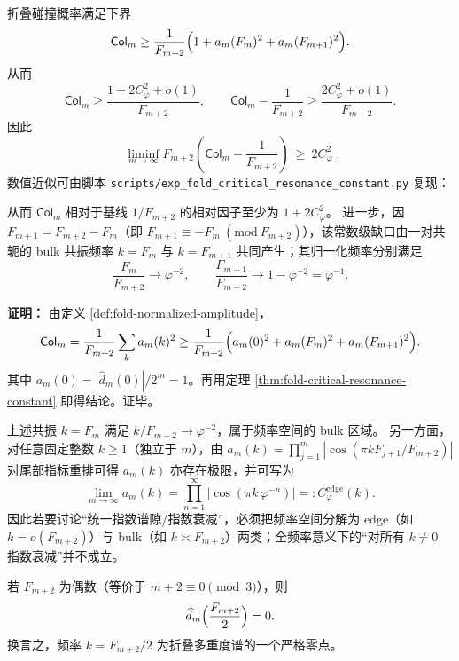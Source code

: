 \begin{corollary}[不可消除的常数级均匀性缺口]\label{cor:fold-critical-resonance-gap}
折叠碰撞概率满足下界
\[
\mathsf{Col}_m
\ge
\frac{1}{F_{m+2}}\Bigl(1+a_m(F_m)^2+a_m(F_{m+1})^2\Bigr).
\]
从而
\[
\mathsf{Col}_m
\ge \frac{1+2C_\varphi^2+o(1)}{F_{m+2}},
\qquad
\mathsf{Col}_m-\frac{1}{F_{m+2}}
\ge \frac{2C_\varphi^2+o(1)}{F_{m+2}}.
\]
因此
\[
\boxed{\;
\liminf_{m\to\infty}F_{m+2}\!\left(\mathsf{Col}_m-\frac{1}{F_{m+2}}\right)\ \ge\ 2C_\varphi^2\; }.
\]
数值近似可由脚本 \texttt{scripts/exp\_fold\_critical\_resonance\_constant.py} 复现：

从而 \(\mathsf{Col}_m\) 相对于基线 \(1/F_{m+2}\) 的相对因子至少为 \(1+2C_\varphi^2\)。
进一步，因 \(F_{m+1}=F_{m+2}-F_m\)（即 \(F_{m+1}\equiv -F_m\ (\mathrm{mod}\ F_{m+2})\)），该常数级缺口由一对共轭的 bulk 共振频率 \(k=F_m\) 与 \(k=F_{m+1}\) 共同产生；其归一化频率分别满足
\[
\frac{F_m}{F_{m+2}}\to \varphi^{-2},\qquad
\frac{F_{m+1}}{F_{m+2}}\to 1-\varphi^{-2}=\varphi^{-1}.
\]
\end{corollary}

\textbf{证明：}
由定义 \ref{def:fold-normalized-amplitude}，
\[
\mathsf{Col}_m=\frac{1}{F_{m+2}}\sum_{k}a_m(k)^2
\ge \frac{1}{F_{m+2}}\Bigl(a_m(0)^2+a_m(F_m)^2+a_m(F_{m+1})^2\Bigr).
\]
其中 \(a_m(0)=|\widehat d_m(0)|/2^m=1\)。再用定理 \ref{thm:fold-critical-resonance-constant} 即得结论。证毕。

\begin{remark}\label{rem:fold-edge-nondecay}
上述共振 \(k=F_m\) 满足 \(k/F_{m+2}\to \varphi^{-2}\)，属于频率空间的 bulk 区域。
另一方面，对任意固定整数 \(k\ge 1\)（独立于 \(m\)），由
\(
a_m(k)=\prod_{j=1}^m|\cos(\pi kF_{j+1}/F_{m+2})|
\)
对尾部指标重排可得 \(a_m(k)\) 亦存在极限，并可写为
\[
\lim_{m\to\infty}a_m(k)=\prod_{n=1}^{\infty}\bigl|\cos(\pi k\,\varphi^{-n})\bigr|=:C^{\mathrm{edge}}_\varphi(k).
\]
因此若要讨论“统一指数谱隙/指数衰减”，必须把频率空间分解为 edge（如 \(k=o(F_{m+2})\)）与 bulk（如 \(k\asymp F_{m+2}\)）两类；全频率意义下的“对所有 \(k\ne 0\) 指数衰减”并不成立。
\end{remark}

\begin{theorem}[奇偶性诱导的谱零点]
\label{thm:fold-spectrum-parity-zero}
若 $F_{m+2}$ 为偶数（等价于 $m+2\equiv 0\pmod 3$），则
\[
\widehat d_m\Bigl(\frac{F_{m+2}}{2}\Bigr)=0.
\]
换言之，频率 $k=F_{m+2}/2$ 为折叠多重度谱的一个严格零点。
\end{theorem}

